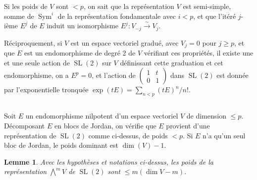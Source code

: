 \documentclass[11pt,a4paper]{article}
\theoremstyle{plain}
\newtheorem{lemma}[theorem]{Lemme}
\theoremstyle{definition}
\DeclareMathOperator{\Sym}{Sym}
\DeclareMathOperator{\SL}{SL}
\begin{document}
Si les poids de $V$ sont $< p$, on sait que la repr\'esentation $V$ est semi-simple, somme de $\Sym^i$ de la repr\'esentation fondamentale avec $i < p$, et que l'it\'er\'e $j$-i\`eme $E^j$ de $E$ induit un isomorphisme $E^j: V_{-j} \xrightarrow{\sim} V_j$.

R\'eciproquement, si $V$ est un espace vectoriel gradu\'e, avec $V_j = 0$ pour $j \geq p$, et que $E$ est un endomorphisme de degr\'e 2 de $V$ v\'erifiant ces propri\'et\'es, il existe une et une seule action de $\SL(2)$ sur $V$ d\'efinissant cette graduation et cet endomorphisme, on a $E^p = 0$, et l'action de $\begin{pmatrix} 1 & t \\ 0 & 1 \end{pmatrix}$ dans $\SL(2)$ est donn\'ee par l'exponentielle tronqu\'ee $\exp(tE) = \sum_{n < p} (tE)^n/n!$.

\subsection{}
Soit $E$ un endomorphisme nilpotent d'un espace vectoriel $V$ de dimension $\leq p$. D\'ecomposant $E$ en blocs de Jordan, on v\'erifie que $E$ provient d'une repr\'esentation de $\SL(2)$ comme ci-dessus, de poids $< p$. Si $E$ n'a qu'un seul bloc de Jordan, le poids dominant est $\dim(V) - 1$.

\begin{lemma}\label{lem:5.5}
Avec les hypoth\`eses et notations ci-dessus, les poids de la repr\'esentation $\bigwedge^m V$ de $\SL(2)$ sont $\leq m(\dim V - m)$.
\end{lemma}
\end{document}
